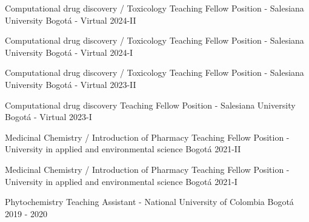 


\begin{cvhonors}

  \cvhonor
    {Computational drug discovery / Toxicology} %
    {Teaching Fellow Position - Salesiana University} %
    {Bogotá - Virtual} %
    {2024-II} %

  \cvhonor
    {Computational drug discovery / Toxicology} %
    {Teaching Fellow Position - Salesiana University} %
    {Bogotá - Virtual} %
    {2024-I} %
    
  \cvhonor
    {Computational drug discovery / Toxicology} %
    {Teaching Fellow Position - Salesiana University} %
    {Bogotá - Virtual} %
    {2023-II} %

  \cvhonor
    {Computational drug discovery} %
    {Teaching Fellow Position - Salesiana University} %
    {Bogotá - Virtual} %
    {2023-I} %

  \cvhonor
    {Medicinal Chemistry / Introduction of Pharmacy} %
    {Teaching Fellow Position - University in applied and environmental science} %
    {Bogotá} %
    {2021-II} %

  \cvhonor
    {Medicinal Chemistry / Introduction of Pharmacy} %
    {Teaching Fellow Position - University in applied and environmental science} %
    {Bogotá} %
    {2021-I} %

  \cvhonor
    {Phytochemistry} %
    {Teaching Assistant - National University of Colombia} %
    {Bogotá} %
    {2019 - 2020} %

\end{cvhonors}
